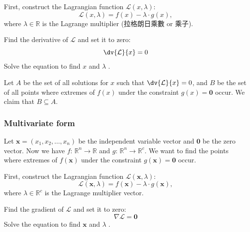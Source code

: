 First, construct the Lagrangian function \( \mathcal{L}(x,\lambda) \):
\[\mathcal{L}(x,\lambda) = f(x) - \lambda \cdot g(x),\]
where \( \lambda\in\mathbb{R} \) is the Lagrange multiplier (拉格朗日乘數 or 乘子).

Find the derivative of $\mathcal{L}$ and set it to zero:
\[
\dv{\mathcal{L}}{x} = 0
\]
Solve the equation to find \( x \) and \( \lambda \) . 

 Let $A$ be the set of all solutions for \( x \) such that $\dv{\mathcal{L}}{x} = 0$, and $B$ be the set of all points where extremes of \( f(x) \) under the constraint \( g(x) = \mathbf{0} \) occur. We claim that $B\subseteq A$.
\subsubsection{Multivariate form}
Let \( \mathbf{x} = (x_1, x_2, \dots, x_n) \) be the independent variable vector and $\mathbf{0}$ be the zero vector. Now we have $f:\,\mathbb{R}^n \rightarrow \mathbb{R}$ and $g:\,\mathbb{R}^n \rightarrow \mathbb{R}^c$. We want to find the points where extremes of \( f(\mathbf{x}) \) under the constraint \( g(\mathbf{x}) = \mathbf{0}\) occur. 

First, construct the Lagrangian function \( \mathcal{L}(\mathbf{x},\lambda) \):
\[
\mathcal{L}(\mathbf{x},\lambda) = f(\mathbf{x}) - \lambda \cdot g(\mathbf{x}),
\]
where \( \lambda\in\mathbb{R}^c \) is the Lagrange multiplier vector.

Find the gradient of $\mathcal{L}$ and set it to zero:
\[
\nabla \mathcal{L} = \mathbf{0}
\]
Solve the equation to find \( \mathbf{x} \) and \( \lambda \) . 

